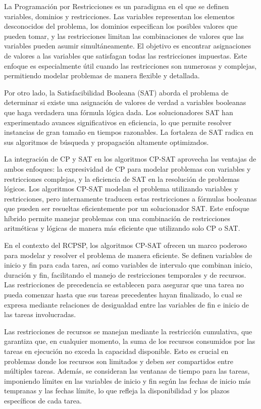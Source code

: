 \documentclass{article}
\begin{document}
La Programación por Restricciones es un paradigma en el que se definen variables, dominios y restricciones. Las variables representan los elementos desconocidos del problema, los dominios especifican los posibles valores que pueden tomar, y las restricciones limitan las combinaciones de valores que las variables pueden asumir simultáneamente. El objetivo es encontrar asignaciones de valores a las variables que satisfagan todas las restricciones impuestas. Este enfoque es especialmente útil cuando las restricciones son numerosas y complejas, permitiendo modelar problemas de manera flexible y detallada.

Por otro lado, la Satisfacibilidad Booleana (SAT) aborda el problema de determinar si existe una asignación de valores de verdad a variables booleanas que haga verdadera una fórmula lógica dada. Los solucionadores SAT han experimentado avances significativos en eficiencia, lo que permite resolver instancias de gran tamaño en tiempos razonables. La fortaleza de SAT radica en sus algoritmos de búsqueda y propagación altamente optimizados.

La integración de CP y SAT en los algoritmos CP-SAT aprovecha las ventajas de ambos enfoques: la expresividad de CP para modelar problemas con variables y restricciones complejas, y la eficiencia de SAT en la resolución de problemas lógicos. Los algoritmos CP-SAT modelan el problema utilizando variables y restricciones, pero internamente traducen estas restricciones a fórmulas booleanas que pueden ser resueltas eficientemente por un solucionador SAT. Este enfoque híbrido permite manejar problemas con una combinación de restricciones aritméticas y lógicas de manera más eficiente que utilizando solo CP o SAT.

En el contexto del RCPSP, los algoritmos CP-SAT ofrecen un marco poderoso para modelar y resolver el problema de manera eficiente. Se definen variables de inicio y fin para cada tarea, así como variables de intervalo que combinan inicio, duración y fin, facilitando el manejo de restricciones temporales y de recursos. Las restricciones de precedencia se establecen para asegurar que una tarea no pueda comenzar hasta que sus tareas precedentes hayan finalizado, lo cual se expresa mediante relaciones de desigualdad entre las variables de fin e inicio de las tareas involucradas.

Las restricciones de recursos se manejan mediante la restricción cumulativa, que garantiza que, en cualquier momento, la suma de los recursos consumidos por las tareas en ejecución no exceda la capacidad disponible. Esto es crucial en problemas donde los recursos son limitados y deben ser compartidos entre múltiples tareas. Además, se consideran las ventanas de tiempo para las tareas, imponiendo límites en las variables de inicio y fin según las fechas de inicio más tempranas y las fechas límite, lo que refleja la disponibilidad y los plazos específicos de cada tarea.
\end{document}
